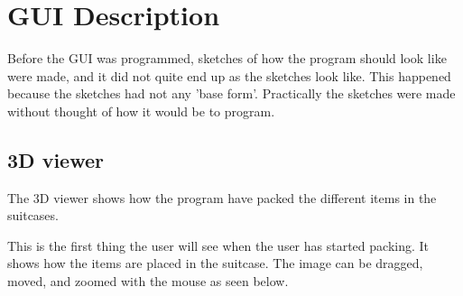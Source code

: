 \section{GUI Description}

Before the GUI was programmed, sketches of how the program should look like were made, and it did not quite end up as the sketches look like. This happened because the sketches had not any 'base form'. Practically the sketches were made without thought of how it would be to program. 

\subsection{3D viewer}
The 3D viewer shows how the program have packed the different items in the suitcases.


This is the first thing the user will see when the user has started packing. It shows how the items are placed in the suitcase.
The image can be dragged, moved, and zoomed with the mouse as seen below. 

